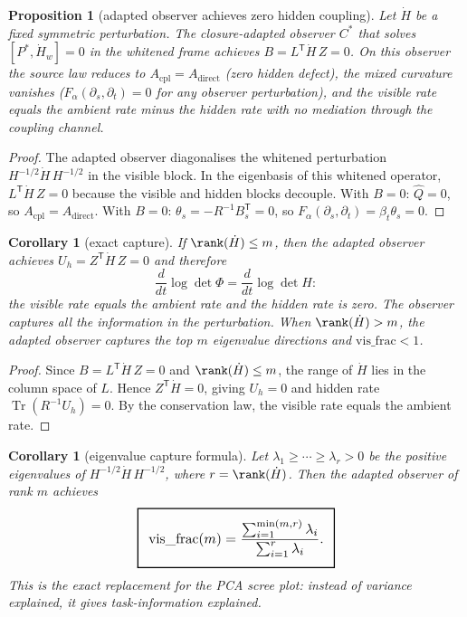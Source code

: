 \documentclass[11pt,a4paper]{article}
\numberwithin{equation}{section}
\DeclareMathOperator{\Tr}{Tr}
\newcommand{\geomboxed}[1]{%
  \setlength{\fboxsep}{8pt}%
  \setlength{\fboxrule}{0.9pt}%
  \fbox{\scalebox{1.10}{$\displaystyle #1$}}%
}
\theoremstyle{thmcompact}
\newtheorem{proposition}[theorem]{Proposition}
\newtheorem{corollary}[theorem]{Corollary}
\theoremstyle{remark}
\begin{document}
\begin{proposition}[adapted observer achieves zero hidden coupling]\label{prop:zero-coupling}
Let $\dot H$ be a fixed symmetric perturbation. The closure-adapted observer $C^*$ that solves $[P^*,\dot H_{w}]=0$ in the whitened frame achieves $B=L^{\mathsf T}\dot H\,Z=0$. On this observer the source law reduces to $A_{\mathrm{cpl}}=A_{\mathrm{direct}}$ (zero hidden defect), the mixed curvature vanishes ($F_\alpha(\partial_s,\partial_t)=0$ for any observer perturbation), and the visible rate equals the ambient rate minus the hidden rate with no mediation through the coupling channel.
\end{proposition}

\begin{proof}
The adapted observer diagonalises the whitened perturbation $H^{-1/2}\dot H\,H^{-1/2}$ in the visible block. In the eigenbasis of this whitened operator, $L^{\mathsf T}\dot H\,Z=0$ because the visible and hidden blocks decouple. With $B=0$: $\widehat Q=0$, so $A_{\mathrm{cpl}}=A_{\mathrm{direct}}$. With $B=0$: $\theta_s=-R^{-1}B_s^{\mathsf T}=0$, so $F_\alpha(\partial_s,\partial_t)=\beta_t\theta_s=0$.
\end{proof}

\begin{corollary}[exact capture]\label{cor:exact-capture}
If $\rank(\dot H)\le m$, then the adapted observer achieves $U_h=Z^{\mathsf T}\dot H\,Z=0$ and therefore
\begin{equation}
\frac{d}{dt}\log\det\Phi=\frac{d}{dt}\log\det H:
\label{eq:exact-capture}
\end{equation}
the visible rate equals the ambient rate and the hidden rate is zero. The observer captures all the information in the perturbation. When $\rank(\dot H)>m$, the adapted observer captures the top $m$ eigenvalue directions and $\mathrm{vis\_frac}<1$.
\end{corollary}

\begin{proof}
Since $B=L^{\mathsf T}\dot H\,Z=0$ and $\rank(\dot H)\le m$, the range of $\dot H$ lies in the column space of $L$. Hence $Z^{\mathsf T}\dot H=0$, giving $U_h=0$ and hidden rate $\Tr(R^{-1}U_h)=0$. By the conservation law, the visible rate equals the ambient rate.
\end{proof}

\begin{corollary}[eigenvalue capture formula]\label{cor:eigenvalue-capture}
Let $\lambda_1\ge\cdots\ge\lambda_r>0$ be the positive eigenvalues of $H^{-1/2}\dot H\,H^{-1/2}$, where $r=\rank(\dot H)$. Then the adapted observer of rank $m$ achieves
\begin{equation}
\geomboxed{\mathrm{vis\_frac}(m)=\frac{\sum_{i=1}^{\min(m,r)}\lambda_i}{\sum_{i=1}^r\lambda_i}.}
\label{eq:eigenvalue-capture}
\end{equation}
This is the exact replacement for the PCA scree plot: instead of variance explained, it gives task-information explained.
\end{corollary}
\end{document}
